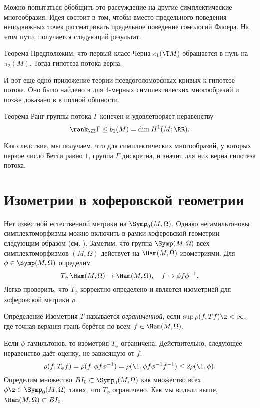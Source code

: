 Можно попытаться обобщить это рассуждение на другие симплектические многообразия.
Идея состоит в том, чтобы вместо предельного поведения неподвижных точек рассматривать предельное поведение гомологий Флоера.
На этом пути, получается следующий результат.


\begin{thm}{Теорема}\label{14.3.A}
Предположим, что первый класс Черна $c_1(\T M)$ обращается в нуль на $\pi_2(M)$.
Тогда гипотеза потока верна.
\end{thm}


И вот ещё одно приложение теории псевдоголоморфных кривых к гипотезе потока.
Оно было найдено в \cite{LMP2} для 4-мерных
симплектических многообразий и позже доказано в \cite{McD2} в полной
общности. 

\begin{thm}{Теорема}\label{14.3.B}
Ранг группы потока $\Gamma$ конечен и удовлетворяет неравенству
\[\rank_\ZZ \Gamma\le b_1(M) = \dim H^1(M;\RR).\]
\end{thm}
Как следствие, мы получаем, что для симплектических многообразий, у
которых первое число Бетти равно $1$, группа $\Gamma$ дискретна, и
значит для них верна гипотеза потока. 


\section{Изометрии в хоферовской геометрии }

Нет известной естественной метрики на $\Symp_0(M,\Omega)$.
Однако негамильтоновы симплектоморфизмы можно включить в рамки
хоферовской геометрии следующим образом (см. \cite{LP}). 
Заметим, что группа $\Symp(M,\Omega)$ всех симплектоморфизмов
$(M,\Omega)$ действует на $\Ham(M,\Omega)$ изометриями.
Для $\phi \in \Symp(M,\Omega)$ определим 
\[T_\phi\: \Ham(M,\Omega) \to \Ham(M,\Omega),
\quad
f \mapsto \phi f\phi^{-1}.\]
Легко проверить, что $T_\phi$ корректно определено и является
изометрией для хоферовской метрики $\rho$. 

\begin{ex*}{Определение}
Изометрия $T$ называется \emph{ограниченной}, если $\sup \rho(f, Tf)\z<\infty$, где
точная верхняя грань берётся по всем $f\in\Ham(M,\Omega)$. 
\end{ex*}


Если $\phi$ гамильтонов, то изометрия $T_\phi$ ограничена.
Действительно, следующее неравенство даёт оценку, не зависящую от $f$:
\[\rho(f,T_\phi f) = \rho(f,\phi f\phi^{-1}) = \rho(\1,\phi
f\phi^{-1}f^{-1})\le 2\rho(\1, \phi).\] 
Определим множество $BI_0 \subset \Symp_0(M,\Omega)$ как множество
всех $\phi \z\in \Symp_0(M,\Omega)$ таких, что $T_\phi$ ограничено. 
Как мы видели выше, $\Ham(M,\Omega)\subset BI_0$.

